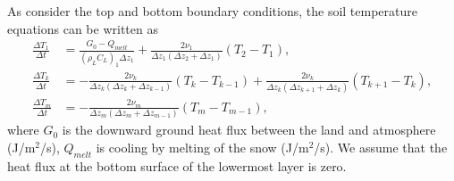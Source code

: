 As consider the top and bottom boundary conditions, the soil temperature equations can be written as
\begin{align}
  \frac{\Delta T_{1}}{\Delta t} &=   \frac{G_{0} - Q_{melt}}{(\rho_{L}C_{L})_{1}\Delta z_{1}} + \frac{2\nu_{1}}{\Delta z_{1}(\Delta z_{2}+\Delta z_{1})} (T_{2}-T_{1}), \\
  \frac{\Delta T_{k}}{\Delta t} &= - \frac{2\nu_{k}}{\Delta z_{k}(\Delta z_{k}+\Delta z_{k-1})} (T_{k}-T_{k-1}) + \frac{2\nu_{k}}{\Delta z_{k}(\Delta z_{k+1}+\Delta z_{k})} (T_{k+1}-T_{k}), \\
  \frac{\Delta T_{m}}{\Delta t} &= - \frac{2\nu_{m}}{\Delta z_{m}(\Delta z_{m}+\Delta z_{m-1})} (T_{m}-T_{m-1}),
\end{align}
where $G_{0}$ is the downward ground heat flux between the land and atmosphere (J/m$^2$/s),
$Q_{melt}$ is cooling by melting of the snow (J/m$^2$/s).
We assume that the heat flux at the bottom surface of the lowermost layer is zero.

